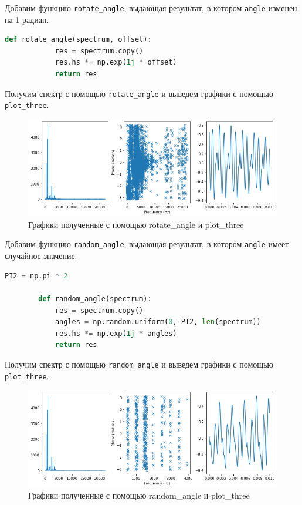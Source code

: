 \documentclass[a4paper, 14pt]{extarticle}
\begin{document}
    Добавим функцию \texttt{rotate\_angle}, выдающая результат, в котором \texttt{angle} изменен на 1 радиан.

    \begin{lstlisting}[language=Python, caption= Функция rotate\_angle, label={lst:rotate_angle}]
        def rotate_angle(spectrum, offset):
            res = spectrum.copy()
            res.hs *= np.exp(1j * offset)
            return res
    \end{lstlisting}

    Получим спектр с помощью \texttt{rotate\_angle} и выведем графики с помощью \texttt{plot\_three}.

    \begin{figure}[H]
        \centering
        \includegraphics[width=0.8\linewidth]{oboe_rotate_angle}
        \caption{Графики полученные с помощью rotate\_angle и plot\_three}
        \label{fig:oboe_rotate_angle}
    \end{figure}

    Добавим функцию \texttt{random\_angle}, выдающая результат, в котором \texttt{angle} имеет случайное значение.

    \begin{lstlisting}[language=Python, caption= Функция random\_angle, label={lst:random_angle}]
        PI2 = np.pi * 2

        def random_angle(spectrum):
            res = spectrum.copy()
            angles = np.random.uniform(0, PI2, len(spectrum))
            res.hs *= np.exp(1j * angles)
            return res
    \end{lstlisting}

    Получим спектр с помощью \texttt{random\_angle} и выведем графики с помощью \texttt{plot\_three}.

    \begin{figure}[H]
        \centering
        \includegraphics[width=0.8\linewidth]{oboe_random_angle}
        \caption{Графики полученные с помощью random\_angle и plot\_three}
        \label{fig:oboe_random_angle}
    \end{figure}
\end{document}
